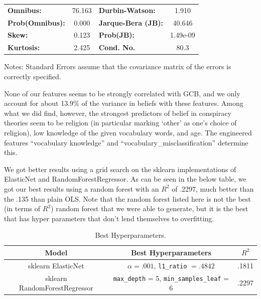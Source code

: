 \documentclass{article}[11pt]
\begin{document}
\begin{center}
\begin{tabular}{lcccccc}
\bottomrule
\end{tabular}
\begin{tabular}{lclc}
\textbf{Omnibus:}       & 76.163 & \textbf{  Durbin-Watson:     } &    1.910  \\
\textbf{Prob(Omnibus):} &  0.000 & \textbf{  Jarque-Bera (JB):  } &   40.646  \\
\textbf{Skew:}          &  0.123 & \textbf{  Prob(JB):          } & 1.49e-09  \\
\textbf{Kurtosis:}      &  2.425 & \textbf{  Cond. No.          } &     80.3  \\
\bottomrule
\end{tabular}
\end{center}

Notes: \newline
 [1] Standard Errors assume that the covariance matrix of the errors is
correctly specified.

None of our features seems to be strongly correlated with GCB, and we
only account for about 13.9\% of the variance in beliefs with these
features. Among what we did find, however, the strongest predictors of
belief in conspiracy theories seem to be religion (in particular marking
`other' as one's choice of religion), low knowledge of the given
vocabulary words, and age. The engineered features ``vocabulary
knowledge'' and ``vocabulary\_misclassification'' determine this.

We got better results using a grid search on the sklearn implementations
of ElasticNet and RandomForestRegressor. As can be seen in the below
table, we got our best results using a random forest with an \(R^2\) of
.2297, much better than the .135 than plain OLS. Note that the random
forest listed here is not the best (in terms of \(R^2\)) random forest
that we were able to generate, but it is the best that has hyper
parameters that don't lend themselves to overfitting.

\begin{table}[ht]
	\centering
	\caption{Best Hyperparameters.} \label{tab:hyper} 
	\vspace{10mm}
\begin{tabular}{ |c|c|c| } 
       \hline
       Model & Best Hyperparameters & $R^2$ \\ 
       \hline
       sklearn ElasticNet & $\alpha = .001$, \verb|l1_ratio| $= .4842$ & .1811 \\ 
       sklearn RandomForestRegressor & \verb|max_depth| = 5, \verb|min_samples_leaf| = 6 & .2297 \\
       \hline
	\end{tabular}
\end{table}
\end{document}
